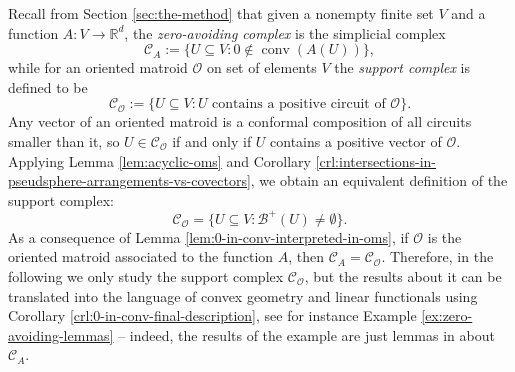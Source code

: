 \documentclass[a4paper,11pt,reqno, english]{amsart}
\theoremstyle{definition}
\theoremstyle{remark}
\newcommand\R{\mathbb R}
\DeclareMathOperator{\conv}{\mathrm{conv}}
\begin{document}
Recall from Section \ref{sec:the-method} that given a nonempty finite set $V$ and a function $A\colon V\to\R^d$, the \emph{zero-avoiding complex} is the simplicial complex
\[
    \mathscr{C}_A:=\{U\subseteq V:0\notin\conv(A(U))\},
\]
while for an oriented matroid $\mathscr{O}$ on set of elements $V$ the \emph{support complex} is defined to be
\[
    \mathscr{C}_\mathscr{O}:=\{U\subseteq V:U\text{~contains a positive circuit of~}\mathscr{O}\}.
\]
Any vector of an oriented matroid is a conformal composition of all circuits smaller than it, so $U\in\mathscr{C}_\mathscr{O}$ if and only if $U$ contains a positive vector of $\mathscr{O}$. Applying Lemma \ref{lem:acyclic-oms} and Corollary \ref{crl:intersections-in-pseudsphere-arrangements-vs-covectors}, we obtain an equivalent definition of the support complex:
\[
    \mathscr{C}_\mathscr{O}=\{U\subseteq V:\mathscr{B}^+(U)\neq\emptyset\}.
\]
As a consequence of Lemma \ref{lem:0-in-conv-interpreted-in-oms}, if $\mathscr{O}$ is the oriented matroid associated to the function $A$, then $\mathscr{C}_A=\mathscr{C}_\mathscr{O}$. Therefore, in the following we only study the support complex $\mathscr{C}_\mathscr{O}$, but the results about it can be translated into the language of convex geometry and linear functionals using Corollary \ref{crl:0-in-conv-final-description}, see for instance Example \ref{ex:zero-avoiding-lemmas} -- indeed, the results of the example are just lemmas in \cite{Blagojevic2025} about $\mathscr{C}_A$. 
\end{document}
